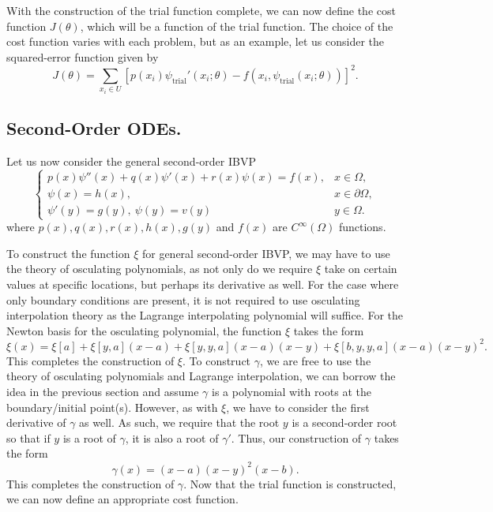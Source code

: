\documentclass[10pt]{article}
\theoremstyle{plain}
\theoremstyle{definition}
\theoremstyle{remark}
\numberwithin{theorem}{section}
\numberwithin{proposition}{section}
\numberwithin{remark}{section}
\numberwithin{corollary}{section}
\numberwithin{definition}{section}
\numberwithin{lemma}{section}
\numberwithin{equation}{section}
\DeclareMathOperator{\T}{trial}
\begin{document}
With the construction of the trial function complete, we can now define the cost function $J(\theta)$, which will be a function of the trial function. The choice of the cost function varies with each problem, but as an example, let us consider the squared-error function given by 
\begin{equation}
	\label{first-order ODEs, example of a cost function}
	\displaystyle J(\theta) = \sum\limits_{x_i \in U}{[p(x_i)\psi_{\T}'(x_i; \theta) - f(x_i, \psi_{\T}(x_i;\theta))]^2}.
\end{equation}
\subsection{Second-Order ODEs.}
Let us now consider the general second-order IBVP
\begin{equation}
	\label{ODEs, IBVP}
	\displaystyle \begin{cases}
		p(x)\psi''(x) + q(x)\psi'(x) + r(x)\psi(x) = f(x), & x \in \Omega, \\
		\psi(x) = h(x), & x \in \partial \Omega, \\
		\psi'(y) = g(y), \: \psi(y) = v(y) & y \in \Omega.
	\end{cases}
\end{equation}
where $p(x), q(x), r(x), h(x), g(y)$ and $f(x)$ are $C^\infty(\Omega)$ functions. 

To construct the function $\xi$ for general second-order IBVP, we may have to use the theory of osculating polynomials, as not only do we require $\xi$ take on certain values at specific locations, but perhaps its derivative as well. For the case where only boundary conditions are present, it is not required to use osculating interpolation theory as the Lagrange interpolating polynomial will suffice. For the Newton basis for the osculating polynomial, the function $\xi$ takes the form 
\begin{equation}
	\label{ODEs, assumed form of xi}
	\displaystyle \xi(x) = \xi[a] + \xi[y,a](x - a) + \xi[y,y,a](x-a)(x-y) + \xi[b,y,y,a](x-a)(x-y)^2.
\end{equation}
This completes the construction of $\xi$. To construct $\gamma$, we are free to use the theory of osculating polynomials and Lagrange interpolation, we can borrow the idea in the previous section and assume $\gamma$ is a polynomial with roots at the boundary/initial point(s). However, as with $\xi$, we have to consider the first derivative of $\gamma$ as well. As such, we require that the root $y$ is a second-order root so that if $y$ is a root of $\gamma$, it is also a root of $\gamma'$. Thus, our construction of $\gamma$ takes the form 
\begin{equation}
	\label{second-order ODEs, assumed form of gamma}
	\displaystyle \gamma(x) = (x-a)(x-y)^2(x-b).
\end{equation}
This completes the construction of $\gamma$. Now that the trial function is constructed, we can now define an appropriate cost function. 
\end{document}

